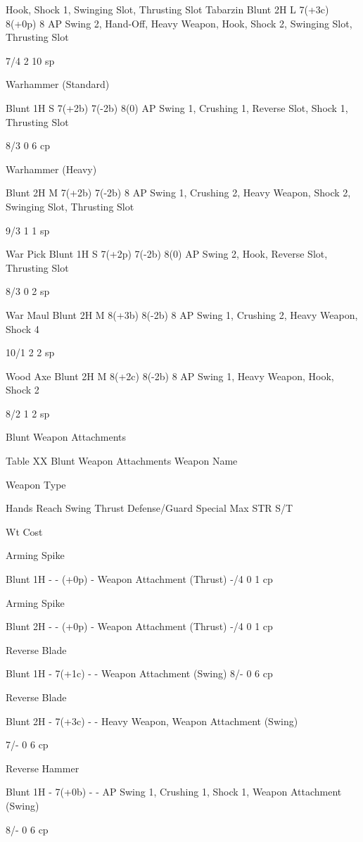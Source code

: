 \documentclass[oneside,11pt,english]{book}
\begin{document}
Hook, Shock 1, 
Swinging Slot, 
Thrusting Slot 
Tabarzin Blunt 2H L 7(+3c) 8(+0p) 8 AP Swing 2, Hand-Off, 
Heavy Weapon, Hook, 
Shock 2, Swinging Slot, 
Thrusting Slot 

7/4 2 10 
sp 

Warhammer 
(Standard) 

Blunt 1H S 7(+2b) 7(-2b) 8(0) AP Swing 1, Crushing 
1, Reverse Slot, Shock 
1, Thrusting Slot 

8/3 0 6 cp 

Warhammer 
(Heavy) 

Blunt 2H M 7(+2b) 7(-2b) 8 AP Swing 1, Crushing 
2, Heavy Weapon, 
Shock 2, Swinging Slot, 
Thrusting Slot 

9/3 1 1 sp 

War Pick Blunt 1H S 7(+2p) 7(-2b) 8(0) AP Swing 2, Hook, 
Reverse Slot, Thrusting 
Slot 

8/3 0 2 sp 

War Maul Blunt 2H M 8(+3b) 8(-2b) 8 AP Swing 1, Crushing 
2, Heavy Weapon, 
Shock 4 

10/1 2 2 sp 

Wood Axe Blunt 2H M 8(+2c) 8(-2b) 8 AP Swing 1, Heavy 
Weapon, Hook, Shock 2 

8/2 1 2 sp 

 
Blunt Weapon Attachments 

 
Table XX Blunt Weapon Attachments 
Weapon 
Name 

Weapon 
Type 

Hands Reach Swing Thrust Defense/Guard Special Max 
STR 
S/T 

Wt Cost 

Arming 
Spike 

Blunt 1H - - (+0p) - Weapon Attachment (Thrust) -/4 0 1 cp 

Arming 
Spike 

Blunt 2H - - (+0p) - Weapon Attachment (Thrust) -/4 0 1 cp 

Reverse 
Blade 

Blunt 1H - 7(+1c) - - Weapon Attachment (Swing) 8/- 0 6 cp 

Reverse 
Blade 

Blunt 2H - 7(+3c) - - Heavy Weapon, Weapon 
Attachment (Swing) 

7/- 0 6 cp 

Reverse 
Hammer 

Blunt 1H - 7(+0b) - - AP Swing 1, Crushing 1, 
Shock 1, Weapon Attachment 
(Swing) 

8/- 0 6 cp 
\end{document}
